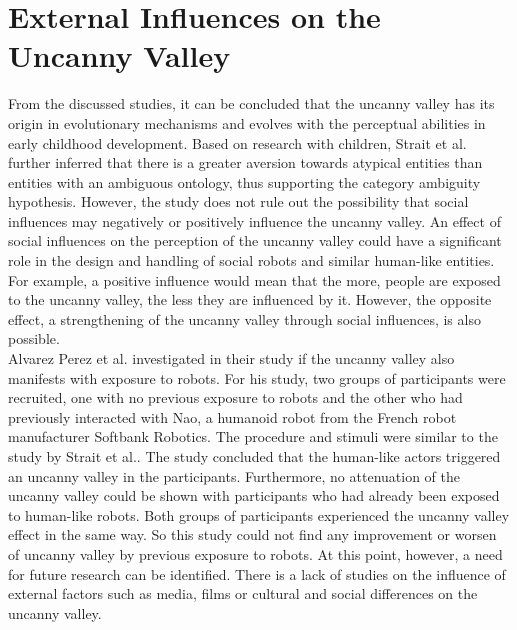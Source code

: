 \section{External Influences on the Uncanny Valley}
From the discussed studies, it can be concluded that the uncanny valley has its origin in evolutionary mechanisms and evolves with the perceptual abilities in early childhood development. Based on research with children, Strait et al. \cite{childrens_responding} further inferred that there is a greater aversion towards atypical entities than entities with an ambiguous ontology, thus supporting the category ambiguity hypothesis. However, the study does not rule out the possibility that social influences may negatively or positively influence the uncanny valley. An effect of social influences on the perception of the uncanny valley could have a significant role in the design and handling of social robots and similar human-like entities. For example, a positive influence would mean that the more, people are exposed to the uncanny valley, the less they are influenced by it. However, the opposite effect, a strengthening of the uncanny valley through social influences, is also possible.\\
Alvarez Perez et al. \cite{prior_exposure_robots} investigated in their study if the uncanny valley also manifests with exposure to robots. For his study, two groups of participants were recruited, one with no previous exposure to robots and the other who had previously interacted with Nao, a humanoid robot from the French robot manufacturer Softbank Robotics. The procedure and stimuli were similar to the study by Strait et al.. The study concluded that the human-like actors triggered an uncanny valley in the participants. Furthermore, no attenuation of the uncanny valley could be shown with participants who had already been exposed to human-like robots. Both groups of participants experienced the uncanny valley effect in the same way. So this study could not find any improvement or worsen of uncanny valley by previous exposure to robots. At this point, however, a need for future research can be identified. There is a lack of studies on the influence of external factors such as media, films or cultural and social differences on the uncanny valley.  




